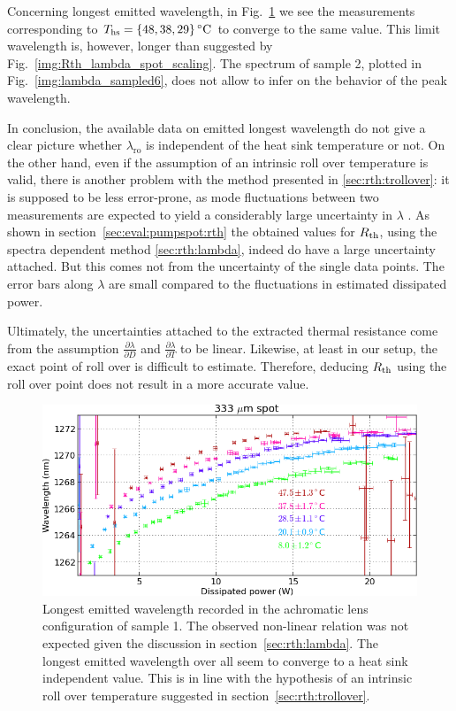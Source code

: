 Concerning longest emitted wavelength,
in Fig.~\ref{img:lambda_sample}
we see the measurements
corresponding to
$T_\mathrm{hs}=\{48,38,29\}\,^\circ\mathrm{C}$
to converge to the same value.
This limit wavelength is,
however,
longer than suggested
by Fig.~\ref{img:Rth_lambda_spot_scaling}.
The spectrum of sample 2,
plotted in Fig.~\ref{img:lambda_sampled6},
does not allow to infer
on the behavior of the peak wavelength.

In conclusion,
the available data
on emitted longest wavelength
do not give a clear picture
whether $\lambda_\mathrm{ro}$
is independent of the heat sink temperature
or not.
On the other hand,
even if the assumption
of an intrinsic roll over temperature
is valid,
there is another problem
with the method presented in \ref{sec:rth:trollover}:
it is supposed to be less error-prone,
as mode fluctuations
between two measurements
are expected to yield
a considerably large uncertainty
in $\lambda$ \cite{Heinen2012}.
As shown in section~\ref{sec:eval:pumpspot:rth}
the obtained values for $R_\mathrm{th}$,
using the spectra dependent method \ref{sec:rth:lambda},
indeed do have a large uncertainty attached.
But this comes not from the uncertainty
of the single data points.
The error bars along $\lambda$ are small
compared to the fluctuations
in estimated dissipated power.

Ultimately,
the uncertainties
attached to the extracted thermal resistance
come from the assumption  
$\frac{\partial \lambda}{\partial D}$
and $\frac{\partial \lambda}{\partial T}$
to be linear.
Likewise,
at least in our setup,
the exact point of roll over
is difficult to estimate.
Therefore,
deducing $R_\mathrm{th}$
using the roll over point
does not result in a more accurate value.


\begin{figure}
\centering
\includegraphics[width=14.5cm]{img/lambda_sample.png}
\caption{Longest emitted wavelength
recorded in the achromatic lens configuration
of sample 1.
The observed non-linear relation was not expected
given the discussion in section~\ref{sec:rth:lambda}.
The longest emitted wavelength
over all
seem to converge to a heat sink independent value.
This is in line with
the hypothesis of an intrinsic roll over temperature
suggested in section~\ref{sec:rth:trollover}.}
\label{img:lambda_sample}
\end{figure}

